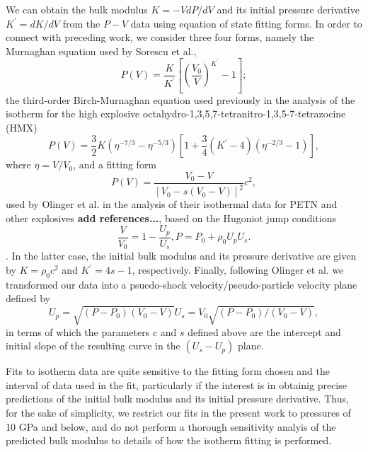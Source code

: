 \documentclass[prb,aps,nobibnotes,twocolumn,doublespace,twocolumngrid,superbib]{revtex4}
\begin{document}
We can obtain the bulk modulus $K=-VdP/dV$ and its initial pressure
derivative $K^\prime=dK/dV$ from the $P-V$ data using equation of state 
fitting forms.  In order to connect with preceding work, we consider
three four forms, namely the Murnaghan equation\cite{Murnaghan_1951}
used by Sorescu et al.,
\begin{equation}
P(V)=\frac{K}{K^\prime}\left[\left(\frac{V_0}{V}\right)^{K^\prime}-1\right];
\end{equation}
the third-order Birch-Murnaghan equation\cite{Poirier_1991} 
used previously in the analysis of the isotherm for the
high explosive 
octahydro-1,3,5,7-tetranitro-1,3,5-7-tetrazocine 
(HMX)\cite{Yoo_1999v111,Menikoff_2001v21,Sewell_2003}
\begin{equation}
P(V)=\frac{3}{2}K(\eta^{-7/3}-\eta^{-5/3})
     [1+\frac{3}{4}(K^\prime -4)(\eta^{-2/3}-1)],
\end{equation}
where $\eta=V/V_0$, and a fitting form
\begin{equation}
P(V)=\frac{V_0-V}{[V_0-s(V_0-V)]^2}c^2,
\end{equation}
used by Olinger et al. in the analysis of their isothermal data for
PETN and other explosives {\bf add references...},
based on the Hugoniot jump conditions
\[ \frac{V}{V_0}=1-\frac{U_p}{U_s}, P=P_0+\rho_0U_pU_s. \].
In the latter case, the initial bulk modulus and its pressure derivative
are given by $K=\rho_0c^2$ and $K^\prime=4s-1$, respectively.  Finally,
following Olinger et al. we transformed our data into a psuedo-shock
velocity/pseudo-particle velocity plane defined by
\begin{equation}
U_p=\sqrt{(P-P_0)(V_0-V)}
U_s=V_0\sqrt{(P-P_0)/(V_0-V)},
\end{equation}
in terms of which the parameters $c$ and $s$ defined above are the
intercept and initial slope of the resulting curve in the $(U_s-U_p)$
plane.

Fits to isotherm data are quite sensitive to the fitting form chosen
and the interval of data used in the fit, particularly if the interest
is in obtainig precise predictions of the initial bulk modulus and
its initial pressure derivative.  Thus, for the sake of simplicity,
we restrict our fits in the present work to pressures of 10 GPa and
below, and do not perform a thorough sensitivity analyis of the
predicted bulk modulus to details of how the isotherm fitting is
performed.
\end{document}
